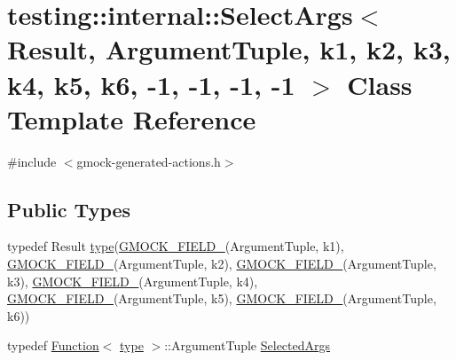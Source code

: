\hypertarget{classtesting_1_1internal_1_1SelectArgs_3_01Result_00_01ArgumentTuple_00_01k1_00_01k2_00_01k3_00_bb7097ad0bebc299c171ea7e2f7fc9a0}{}\section{testing\+::internal\+::Select\+Args$<$ Result, Argument\+Tuple, k1, k2, k3, k4, k5, k6, -\/1, -\/1, -\/1, -\/1 $>$ Class Template Reference}
\label{classtesting_1_1internal_1_1SelectArgs_3_01Result_00_01ArgumentTuple_00_01k1_00_01k2_00_01k3_00_bb7097ad0bebc299c171ea7e2f7fc9a0}


{\ttfamily \#include $<$gmock-\/generated-\/actions.\+h$>$}

\subsection*{Public Types}
\begin{DoxyCompactItemize}
\item 
typedef Result \mbox{\hyperlink{classtesting_1_1internal_1_1SelectArgs_3_01Result_00_01ArgumentTuple_00_01k1_00_01k2_00_01k3_00_bb7097ad0bebc299c171ea7e2f7fc9a0_a55ed466f9866d0247c5c9ec8b1bf694f}{type}}(\mbox{\hyperlink{gmock-generated-actions_8h_a6eb3ce92b0613603057a20ec9e593317}{G\+M\+O\+C\+K\+\_\+\+F\+I\+E\+L\+D\+\_\+}}(Argument\+Tuple, k1), \mbox{\hyperlink{gmock-generated-actions_8h_a6eb3ce92b0613603057a20ec9e593317}{G\+M\+O\+C\+K\+\_\+\+F\+I\+E\+L\+D\+\_\+}}(Argument\+Tuple, k2), \mbox{\hyperlink{gmock-generated-actions_8h_a6eb3ce92b0613603057a20ec9e593317}{G\+M\+O\+C\+K\+\_\+\+F\+I\+E\+L\+D\+\_\+}}(Argument\+Tuple, k3), \mbox{\hyperlink{gmock-generated-actions_8h_a6eb3ce92b0613603057a20ec9e593317}{G\+M\+O\+C\+K\+\_\+\+F\+I\+E\+L\+D\+\_\+}}(Argument\+Tuple, k4), \mbox{\hyperlink{gmock-generated-actions_8h_a6eb3ce92b0613603057a20ec9e593317}{G\+M\+O\+C\+K\+\_\+\+F\+I\+E\+L\+D\+\_\+}}(Argument\+Tuple, k5), \mbox{\hyperlink{gmock-generated-actions_8h_a6eb3ce92b0613603057a20ec9e593317}{G\+M\+O\+C\+K\+\_\+\+F\+I\+E\+L\+D\+\_\+}}(Argument\+Tuple, k6))
\item 
typedef \mbox{\hyperlink{structtesting_1_1internal_1_1Function}{Function}}$<$ \mbox{\hyperlink{classtesting_1_1internal_1_1SelectArgs_3_01Result_00_01ArgumentTuple_00_01k1_00_01k2_00_01k3_00_bb7097ad0bebc299c171ea7e2f7fc9a0_a55ed466f9866d0247c5c9ec8b1bf694f}{type}} $>$\+::Argument\+Tuple \mbox{\hyperlink{classtesting_1_1internal_1_1SelectArgs_3_01Result_00_01ArgumentTuple_00_01k1_00_01k2_00_01k3_00_bb7097ad0bebc299c171ea7e2f7fc9a0_ad0660960820cc63f7f7a3b78c792c1e3}{Selected\+Args}}
\end{DoxyCompactItemize}

